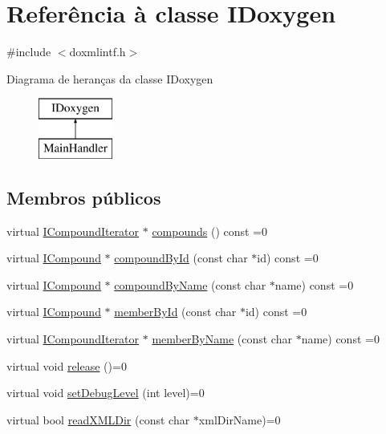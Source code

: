 \hypertarget{class_i_doxygen}{\section{Referência à classe I\-Doxygen}
\label{class_i_doxygen}
}


{\ttfamily \#include $<$doxmlintf.\-h$>$}

Diagrama de heranças da classe I\-Doxygen\begin{figure}[H]
\begin{center}
\leavevmode
\includegraphics[height=2.000000cm]{class_i_doxygen}
\end{center}
\end{figure}
\subsection*{Membros públicos}
\begin{DoxyCompactItemize}
\item 
virtual \hyperlink{class_i_compound_iterator}{I\-Compound\-Iterator} $\ast$ \hyperlink{class_i_doxygen_a848771b4fe232e6e5cc20bbd24003b9a}{compounds} () const =0
\item 
virtual \hyperlink{class_i_compound}{I\-Compound} $\ast$ \hyperlink{class_i_doxygen_a8f9881ed1ce72c6175004c6900355678}{compound\-By\-Id} (const char $\ast$id) const =0
\item 
virtual \hyperlink{class_i_compound}{I\-Compound} $\ast$ \hyperlink{class_i_doxygen_a4be0c48735978cad12566bdfee123054}{compound\-By\-Name} (const char $\ast$name) const =0
\item 
virtual \hyperlink{class_i_compound}{I\-Compound} $\ast$ \hyperlink{class_i_doxygen_a9d0c3279715cf30bb39adbdb82945e83}{member\-By\-Id} (const char $\ast$id) const =0
\item 
virtual \hyperlink{class_i_compound_iterator}{I\-Compound\-Iterator} $\ast$ \hyperlink{class_i_doxygen_afa621c85f293a87627cd28a3acfb1170}{member\-By\-Name} (const char $\ast$name) const =0
\item 
virtual void \hyperlink{class_i_doxygen_aab0a52fdd148a54108e7bf49287d7c47}{release} ()=0
\item 
virtual void \hyperlink{class_i_doxygen_ae089fad5798566af9e2448199adf6c70}{set\-Debug\-Level} (int level)=0
\item 
virtual bool \hyperlink{class_i_doxygen_a61aec31e08104687be1d5d7a0aad1cd2}{read\-X\-M\-L\-Dir} (const char $\ast$xml\-Dir\-Name)=0
\end{DoxyCompactItemize}


